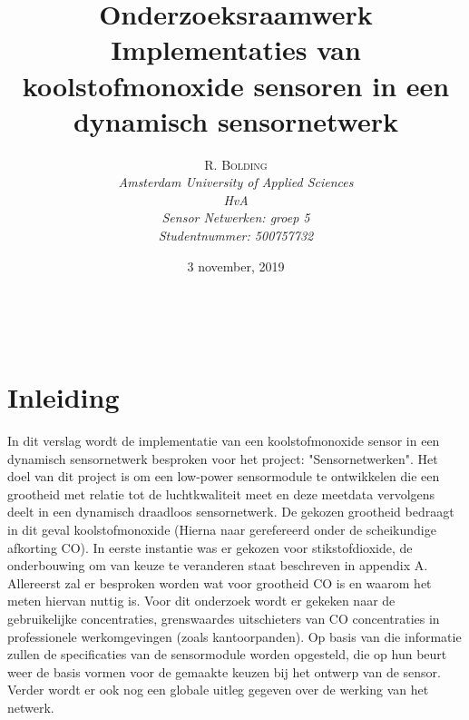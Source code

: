 \documentclass[a4paper, 11pt]{article} %
\title{\textbf{Onderzoeksraamwerk}\\ %
	Implementaties van koolstofmonoxide sensoren in een dynamisch sensornetwerk} %
\author{\textsc{R. Bolding} %
	\\{\textit{Amsterdam University of Applied Sciences\\ 
			HvA\\
			Sensor Netwerken: groep 5\\
			Studentnummer: 500757732}}} %
\date{3 november, 2019} %
\makeatletter
\renewcommand{\maketitle}{ %
	\begin{flushright} %
		{\LARGE\@title} %
		
		\vspace{50pt} %
		
		{\large\@author} %
		\\\@date %
		
		\vspace{40pt} %
	\end{flushright}
}
\makeatother
\begin{document}
	\captionsetup{justification=centering}
	\renewcommand{\contentsname}{Inhoudsopgave}
	\def\textsubscript#1{\ensuremath{_{\mbox{\textscale{.6}{#1}}}}}
	\hypersetup{hidelinks=true}
	\maketitle %
	
	
	
	
	\vspace{10pt} %
	
	\newpage
	\tableofcontents
	\newpage
	\section{Inleiding} \label{sec::Inleiding}
	In dit verslag wordt de implementatie van een koolstofmonoxide sensor in een dynamisch sensornetwerk besproken voor het project: "Sensornetwerken". Het doel van dit project is om een low-power sensormodule te ontwikkelen die een grootheid met relatie tot de luchtkwaliteit meet en deze meetdata vervolgens deelt in een dynamisch draadloos sensornetwerk. De gekozen grootheid bedraagt in dit geval koolstofmonoxide (Hierna naar gerefereerd onder de scheikundige afkorting CO). In eerste instantie was er gekozen voor stikstofdioxide, de onderbouwing om van keuze te veranderen staat beschreven in appendix A. Allereerst zal er besproken worden wat voor grootheid CO is en waarom het meten hiervan nuttig is. Voor dit onderzoek wordt er gekeken naar de gebruikelijke concentraties, grenswaardes uitschieters van CO concentraties in professionele werkomgevingen (zoals kantoorpanden). Op basis van die informatie zullen de specificaties van de sensormodule worden opgesteld, die op hun beurt weer de basis vormen voor de gemaakte keuzen bij het ontwerp van de sensor. Verder wordt er ook nog een globale uitleg gegeven over de werking van het netwerk.
	
\end{document}

